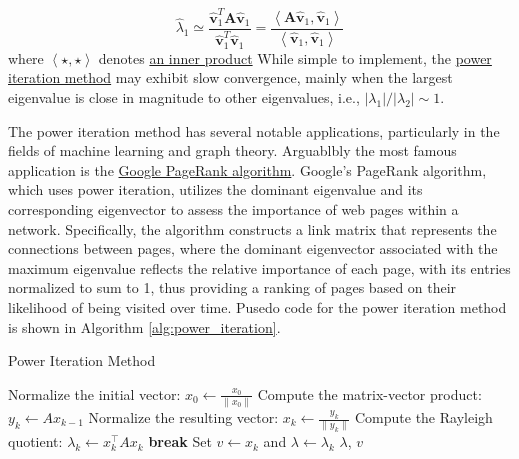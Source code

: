 \documentclass{article}[11pt]
\begin{document}
\begin{mdframed}
\begin{itemize}[leftmargin=16pt]
{   \begin{equation}
      \hat{\lambda}_{1} \simeq \frac{\hat{\mathbf{v}}_{1}^{T}\mathbf{A}\hat{\mathbf{v}}_{1}}{\hat{\mathbf{v}}_{1}^{T}\hat{\mathbf{v}}_{1}} = \frac{\left<\mathbf{A}\hat{\mathbf{v}}_{1},\hat{\mathbf{v}}_{1}\right>}{\left<\hat{\mathbf{v}}_{1},\hat{\mathbf{v}}_{1}\right>}
   \end{equation}
where $\left<\star,\star\right>$ denotes \href{https://mathworld.wolfram.com/InnerProduct.html}{an inner product}}
While simple to implement, the \href{https://en.wikipedia.org/wiki/Power_iteration}{power iteration method} may exhibit slow convergence, mainly when the largest eigenvalue is close in magnitude to other eigenvalues, i.e., $|\lambda_{1}|/|\lambda_{2}| \sim 1$.
\end{itemize}
\end{mdframed}
The power iteration method has several notable applications, particularly in the fields of machine learning and graph theory.
Arguablbly the most famous application is the \href{https://en.wikipedia.org/wiki/PageRank}{Google PageRank algorithm}.
Google's PageRank algorithm, which uses power iteration, utilizes the dominant eigenvalue and its corresponding eigenvector to assess the importance of web pages within a network.
Specifically, the algorithm constructs a link matrix that represents the connections between pages, where the dominant eigenvector associated with the maximum eigenvalue 
reflects the relative importance of each page, with its entries normalized to sum to 1, thus providing a ranking of pages based on their likelihood of being visited over time.
Pusedo code for the power iteration method is shown in Algorithm \ref{alg:power_iteration}.

\begin{algorithm}[H]
   \caption{Power Iteration Method}\label{alg:power_iteration}
   \begin{algorithmic}[1]
   
   \State Normalize the initial vector: $x_0 \leftarrow \frac{x_0}{\|x_0\|}$
       \State Compute the matrix-vector product: $y_k \leftarrow A x_{k-1}$
       \State Normalize the resulting vector: $x_k \leftarrow \frac{y_k}{\|y_k\|}$
       \State Compute the Rayleigh quotient: $\lambda_k \leftarrow x_k^\top A x_k$
           \State \textbf{break}
       \EndIf
   \EndFor
   \State Set $v \leftarrow x_k$ and $\lambda \leftarrow \lambda_k$
   \Return $\lambda$, $v$
   \end{algorithmic}
\end{algorithm}
\end{document}
